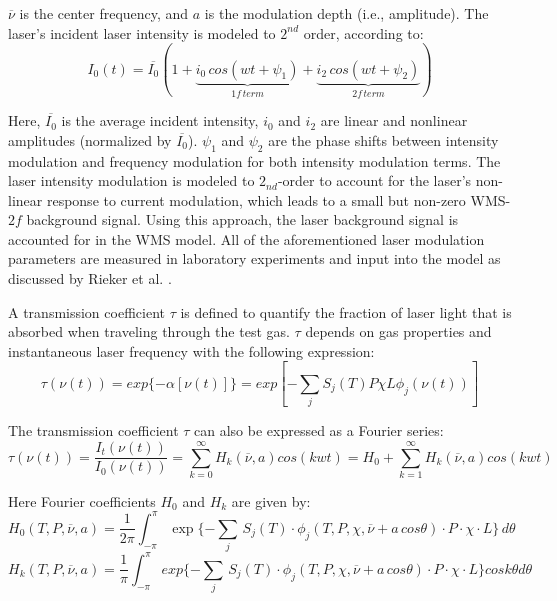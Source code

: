 \noindent $\overline{\nu}$ is the center frequency, and $a$ is the modulation depth (i.e., amplitude). The laser's incident laser intensity is modeled to $2^{nd}$ order, according to: 
\begin{equation}
I_0(t)=\overline{I_0}(1+\underbrace{i_0\,cos(wt+\psi_1)}_{1f\,term}+\underbrace{i_2\,cos(wt+\psi_2)}_{2f\,term})
\end{equation}

\noindent Here, $\overline{I_0}$ is the average incident intensity, $i_0$ and $i_2$ are linear and nonlinear amplitudes (normalized by $\overline{I_0}$). $\psi_1$ and $\psi_2$ are the phase shifts between intensity modulation and frequency modulation for both intensity modulation terms. The laser intensity modulation is modeled to $2_{nd}$-order to account for the laser's non-linear response to current modulation, which leads to a small but non-zero WMS-$2f$ background signal. Using this approach, the laser background signal is accounted for in the WMS model. All of the aforementioned laser modulation parameters are measured in laboratory experiments and input into the model as discussed by Rieker et al. \cite{rieker2009calibration}.

A transmission coefficient $\tau$ is defined to quantify the fraction of laser light that is absorbed when traveling through the test gas. $\tau$ depends on gas properties and instantaneous laser frequency with the following expression:
\begin{equation}
\tau(\nu(t))=exp\{-\alpha[\nu(t)]\}=exp[-\sum_{j}S_j(T)P\chi L\phi_j(\nu(t))]
\end{equation}

The transmission coefficient $\tau$ can also be expressed as a Fourier series:
\begin{equation}
\tau(\nu(t))=\frac{I_t(\nu(t))}{I_0(\nu(t))}=\sum_{k=0}^{\infty}H_k(\overline{\nu},a)cos(kwt)=H_0+\sum_{k=1}^{\infty}H_k(\overline{\nu},a)cos(kwt)
\end{equation}

\noindent Here Fourier coefficients $H_0$ and $H_k$ are given by:
\begin{equation}
H_0(T,P,\overline{\nu},a)=\frac{1}{2\pi}\int_{-\pi}^{\pi}\exp\{-\sum_j\,S_j(T) \cdot \phi_j(T,P,\chi,\overline{\nu}+a\,cos\theta) \cdot P \cdot \chi \cdot L\}\,d\theta
\end{equation}
\begin{equation}
H_k(T,P,\overline{\nu},a)=\frac{1}{\pi}\int_{-\pi}^{\pi}exp\{-\sum_j\,S_j(T) \cdot \phi_j(T,P,\chi,\overline{\nu}+a\,cos\theta) \cdot P \cdot \chi \cdot L\}cos k\theta d\theta
\end{equation}

